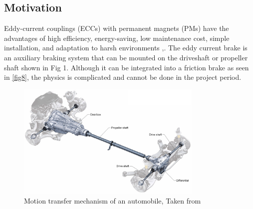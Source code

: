 \documentclass[lettersize,journal]{IEEEtran}
\begin{document}
\subsection{Motivation}
Eddy-current couplings (ECCs) with permanent magnets (PMs) have the advantages of high efficiency, energy-saving, low maintenance cost, simple installation, and adaptation to harsh environments \cite{1201540},\cite{Xioquan2021}. The eddy current brake is an auxiliary braking system that can be mounted on the driveshaft or propeller shaft shown in Fig 1. Although it can be integrated into a friction brake as seen in \ref{fig8}, the physics is complicated and cannot be done in the project period. 
\begin{figure}[!t]
\centering
\includegraphics[width=3.5in]{images/fig1.jpg}
\caption{Motion transfer mechanism of an automobile, Taken from \cite{takawane_2019_car}}
\label{fig1}
\end{figure}
\end{document}
